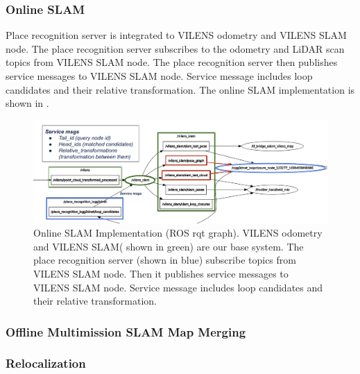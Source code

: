 \subsubsection*{Online SLAM}
Place recognition server is integrated to VILENS odometry and VILENS SLAM node. The place recognition server subscribes to the odometry and LiDAR scan topics from VILENS SLAM node. The place recognition server then publishes service messages to VILENS SLAM node. Service message includes loop candidates and their relative transformation. The online SLAM implementation is shown in . 
\begin{figure}[t]
  \centering
  \includegraphics[width=0.99\columnwidth]{pics/Implementation_Online_SLAM.png}
  \caption{Online SLAM Implementation (ROS rqt graph). VILENS odometry and VILENS SLAM( shown in green) are our base system. The place recognition server (shown in blue) subscribe topics from VILENS SLAM node. Then it publishes service messages to VILENS SLAM node. Service message includes loop candidates and their relative transformation.}
  \label{fig:implementation_online_slam}
\end{figure}


\subsubsection*{Offline Multimission SLAM Map Merging}



\subsubsection*{Relocalization}